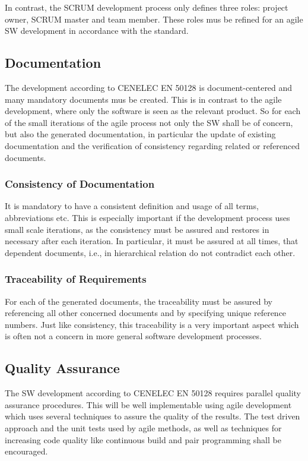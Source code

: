 In contrast, the SCRUM development process only defines three roles: project
owner, SCRUM master and team member. These roles mus be refined for an agile SW
development in accordance with the standard.

\subsection{Documentation}
\label{sec:documentation}

The development according to CENELEC EN 50128 is document-centered and many
mandatory documents mus be created. This is in contrast to the agile
development, where only the software is seen as the relevant product. So for
each of the small iterations of the agile process not only the SW shall be of
concern, but also the generated documentation, in particular the update of
existing documentation and the verification of consistency regarding related or
referenced documents.

\subsubsection{Consistency of Documentation}
\label{sec:cons-docum}

It is mandatory to have a consistent definition and usage of all terms,
abbreviations etc. This is especially important if the development process uses
small scale iterations, as the consistency must be assured and restores in
necessary after each iteration. In particular, it must be assured at all times,
that dependent documents, i.e., in hierarchical relation do not contradict each
other.

\subsubsection{Traceability of Requirements}
\label{sec:trac-requ}

For each of the generated documents, the traceability must be assured by
referencing all other concerned documents and by specifying unique reference
numbers. Just like consistency, this traceability is a very important aspect
which is often not a concern in more general software development processes.


\subsection{Quality Assurance}
\label{sec:quality-assurance}

The SW development according to CENELEC EN 50128 requires parallel quality
assurance procedures. This will be well implementable using agile development
which uses several techniques to assure the quality of the results. The test
driven approach and the unit tests used by agile methods, as well as techniques
for increasing code quality like continuous build and pair programming shall be
encouraged.

